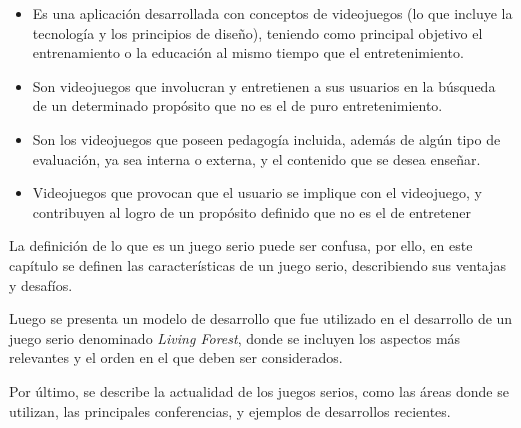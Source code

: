 \begin{itemize}
    \item Es una aplicación desarrollada con conceptos de videojuegos (lo que
        incluye la tecnología y los principios de diseño), teniendo como
        principal objetivo el entrenamiento o la educación al mismo tiempo que
        el entretenimiento\cite{ludus:sg}.
    \item Son videojuegos que involucran y entretienen a sus usuarios en la
        búsqueda de un determinado propósito que no es el de puro
        entretenimiento\cite{ludus:sg}.
    \item Son los videojuegos que poseen pedagogía incluida, además de algún tipo de
        evaluación, ya sea interna o externa, y el contenido que se desea
        enseñar\cite{damien:sg,sg:aoverview}.
    \item Videojuegos que provocan que el usuario se implique con el videojuego, y
        contribuyen al logro de un propósito definido que no es el de
        entretener\cite{sg:aoverview}
\end{itemize}

La definición de lo que es un juego serio puede ser confusa, por ello, en este
capítulo se definen las características de un juego serio, describiendo sus
ventajas y desafíos. 

Luego se presenta un modelo de desarrollo que fue utilizado en el desarrollo de
un juego serio denominado \textit{Living Forest}, donde se incluyen los aspectos
más relevantes y el orden en el que deben ser considerados.

Por último, se describe la actualidad de los juegos serios, como las áreas donde
se utilizan, las principales conferencias, y ejemplos de desarrollos recientes. 





